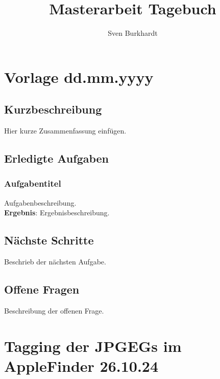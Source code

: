 \documentclass{article}
\title{\Huge Masterarbeit Tagebuch}
\author{Sven Burkhardt}
\date{}
\begin{document}
\maketitle
\noindent\hrulefill

\newpage %
\tableofcontents


\noindent\hrulefill
\section{Vorlage \small dd.mm.yyyy } %

\subsection*{Kurzbeschreibung}
Hier kurze Zusammenfassung einfügen.

\subsection*{Erledigte Aufgaben}
\subsubsection*{\small Aufgabentitel}
 Aufgabenbeschreibung.\\
\textbf{Ergebnis}: Ergebnisbeschreibung.

\subsection*{Nächste Schritte}
 Beschrieb der nächsten Aufgabe.

\subsection*{Offene Fragen}
 Beschreibung der offenen Frage.

\newpage %
\noindent\hrulefill
\section{Tagging der JPGEGs im AppleFinder \small 26.10.24 } %
\end{document}
